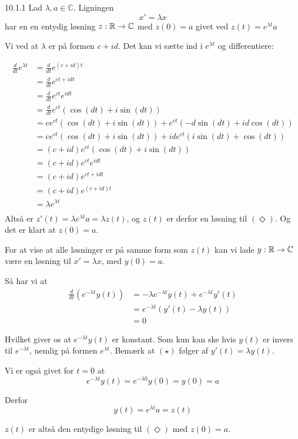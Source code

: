 \begin{lemma}{10.1.1}
	Lad $\lambda, a \in \mathbb{C}$. Ligningen
	\[
		x' = \lambda x\tag{$\Diamond$}
	\]
	har en en entydig løsning $z:\mathbb{R}\rightarrow\mathbb{C}$
	med $z(0) = a$ givet ved $z(t) = e^{\lambda t}a$
\end{lemma}

\begin{bevis}
	\setlength{\parindent}{0cm}
	Vi ved at $\lambda$ er på formen $c + id$. Det kan vi sætte ind i
	$e^{\lambda t}$ og differentiere:

	\newcommand{\dif}{\frac{d}{dt}}
	\begin{align*}
		\dif e^{\lambda t} &= \dif e^{(c + id)t}\\
		&= \dif e^{ct + idt}\\
		&= \dif e^{ct}e^{idt}\\
		&= \dif e^{ct}(\cos(dt) + i\sin(dt))\\
		&= ce^{ct}(\cos(dt) + i\sin(dt)) + e^{ct}(-d\sin(dt) + id\cos(dt))\\
		&= ce^{ct}(\cos(dt) + i\sin(dt)) + ide^{ct}(i\sin(dt) + \cos(dt))\\
		&= (c + id)e^{ct}(\cos(dt) + i\sin(dt))\\
		&= (c + id)e^{ct}e^{idt}\\
		&= (c + id)e^{ct + idt}\\
		&= (c + id)e^{(c + id)t}\\
		&= \lambda e^{\lambda t}\\
	\end{align*}
	Altså er $z'(t) = \lambda e^{\lambda t}a = \lambda z(t)$, og $z(t)$ er
	derfor en løsning til $(\Diamond)$. Og det er klart at $z(0) =a$.

	For at vise at alle løsninger er på samme form som $z(t)$ kan vi lade
	$y:\mathbb{R} \rightarrow \mathbb{C}$ være en løsning til $x' = \lambda x$, med
	$y(0) = a$.

	Så har vi at
	\begin{align*}
		\dif(e^{-\lambda t}y(t)) &= -\lambda e^{-\lambda t}y(t) + e^{-\lambda t}y'(t)\\
		&= e^{-\lambda t}(y'(t) - \lambda y(t))\tag{$\star$}\\
		&= 0
	\end{align*}

	Hvilket giver os at $e^{-\lambda t}y(t)$ er konstant. Som kun kan ske hvis
	$y(t)$ er invers til $e^{-\lambda t}$, nemlig på formen $e^{\lambda t}$.
	Bemærk at $(\star)$ følger af $y'(t) = \lambda y(t)$. 
	
	Vi er også givet for $t = 0$ at
	\[
		e^{-\lambda t}y(t) = e^{-\lambda 0}y(0) = y(0) = a
	\]

	Derfor 
	\[
		y(t) = e^{\lambda t}a = z(t)
	\]

	$z(t)$ er altså den entydige løsning til $(\Diamond)$ med $z(0) = a$.
\end{bevis}
